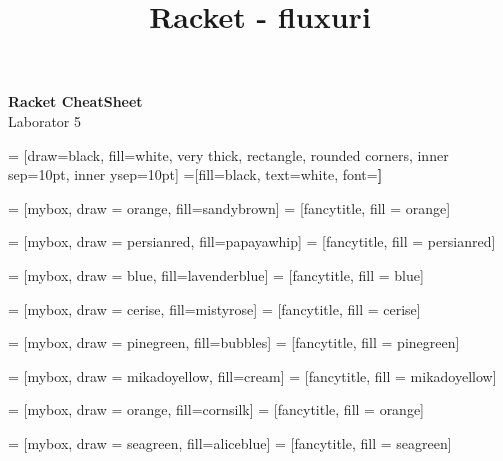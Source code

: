 \documentclass[a4paper]{article}
\title{Racket - fluxuri}
\begin{document}
\begin{center}{\huge{\textbf{Racket CheatSheet}}}\\
{\large Laborator 5}
\end{center}
\begin{multicols*}{3}

 = [draw=black, fill=white, very thick,
    rectangle, rounded corners, inner sep=10pt, inner ysep=10pt]
 =[fill=black, text=white, font=\bfseries]

 = [mybox, draw = orange, fill=sandybrown]
 = [fancytitle, fill = orange]


 = [mybox, draw = persianred, fill=papayawhip]
 = [fancytitle, fill = persianred]

 = [mybox, draw = blue, fill=lavenderblue]
 = [fancytitle, fill = blue]

 = [mybox, draw = cerise, fill=mistyrose]
 = [fancytitle, fill = cerise]

 = [mybox, draw = pinegreen, fill=bubbles]
 = [fancytitle, fill = pinegreen]

 = [mybox, draw = mikadoyellow, fill=cream]
 = [fancytitle, fill = mikadoyellow]

 = [mybox, draw = orange, fill=cornsilk]
 = [fancytitle, fill = orange]

 = [mybox, draw = seagreen, fill=aliceblue]
 = [fancytitle, fill = seagreen]


\end{multicols*}
\end{document}
